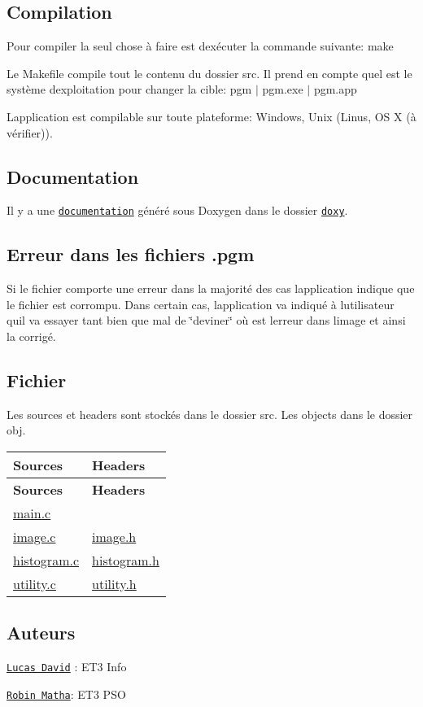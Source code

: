 \subsection*{Compilation }

Pour compiler la seul chose à faire est d\textquotesingle{}exécuter la commande suivante\+: {\ttfamily make}

Le Makefile compile tout le contenu du dossier src. Il prend en compte quel est le système d\textquotesingle{}exploitation pour changer la cible\+: {\ttfamily pgm $\vert$ pgm.\+exe $\vert$ pgm.\+app}

L\textquotesingle{}application est compilable sur toute plateforme\+: Windows, Unix (Linus, OS X (à vérifier)).

\subsection*{Documentation }

Il y a une \href{doxy/html/index.html}{\tt documentation} généré sous Doxygen dans le dossier \href{doxy/}{\tt doxy}.

\subsection*{Erreur dans les fichiers .pgm }

Si le fichier comporte une erreur dans la majorité des cas l\textquotesingle{}application indique que le fichier est corrompu. Dans certain cas, l\textquotesingle{}application va indiqué à l\textquotesingle{}utilisateur qu\textquotesingle{}il va essayer tant bien que mal de \char`\"{}deviner\char`\"{} où est l\textquotesingle{}erreur dans l\textquotesingle{}image et ainsi la corrigé.

\subsection*{Fichier }

Les sources et headers sont stockés dans le dossier src. Les objects dans le dossier obj.

\tabulinesep=1mm
\begin{longtabu} spread 0pt [c]{*{2}{|X[-1]}|}
\hline
\rowcolor{\tableheadbgcolor}\textbf{ Sources  }&\textbf{ Headers   }\\
\endfirsthead
\hline
\endfoot
\hline
\rowcolor{\tableheadbgcolor}\textbf{ Sources  }&\textbf{ Headers   }\\
\endhead
\mbox{\hyperlink{main_8c}{main.\+c}}  &\\
\mbox{\hyperlink{image_8c}{image.\+c}}  &\mbox{\hyperlink{image_8h}{image.\+h}}   \\
\mbox{\hyperlink{histogram_8c}{histogram.\+c}}  &\mbox{\hyperlink{histogram_8h}{histogram.\+h}}   \\
\mbox{\hyperlink{utility_8c}{utility.\+c}}  &\mbox{\hyperlink{utility_8h}{utility.\+h}}   \\
\end{longtabu}


\subsection*{Auteurs }

\href{mailto:lucas.david@u-psud.fr}{\tt Lucas David} \+: E\+T3 Info

\href{mailto:robin.matha@u-psud.fr}{\tt Robin Matha}\+: E\+T3 P\+SO 